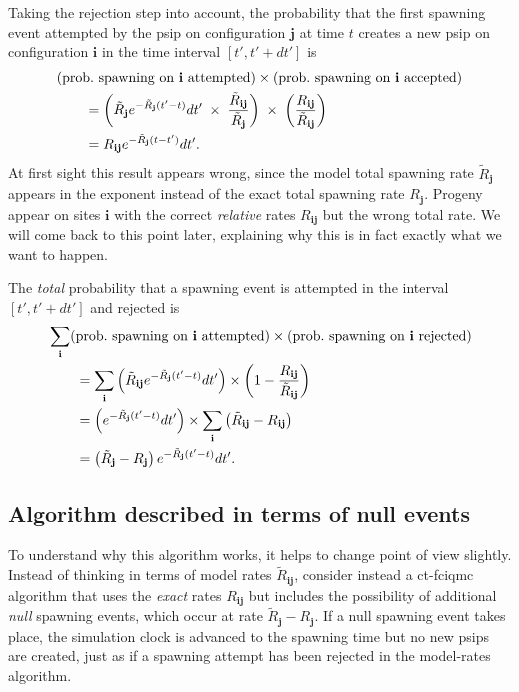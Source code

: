 \documentclass[a4paper, 11pt]{article}
\newcommand{\bi}{\mathbf{i}}
\newcommand{\bj}{\mathbf{j}}
\begin{document}
Taking the rejection step into account, the probability that the first
spawning event attempted by the psip on configuration $\bj$ at time
$t$ creates a new psip on configuration $\bi$ in the time interval
$[t',t'+dt']$ is
\begin{align*}
  \MoveEqLeft (\text{prob.\ spawning on $\bi$ attempted}) \times
  (\text{prob.\ spawning on $\bi$ accepted}) \\
  & = \left ( \tilde{R}_{\bj} e^{-\tilde{R}_{\bj}(t' - t)} dt' \; \times \;
  \frac{\tilde{R}_{\bi\bj}}{\tilde{R}_{\bj}} \right ) \; \times \; 
  \left ( \frac{R_{\bi\bj}}{\tilde{R}_{\bi\bj}} \right ) \\
  & = R_{\bi\bj} e^{-\tilde{R}_{\bj}(t-t')} dt' .
\end{align*}
At first sight this result appears wrong, since the model total spawning
rate $\tilde{R}_{\bj}$ appears in the exponent instead of the exact
total spawning rate $R_{\bj}$. Progeny appear on sites $\bi$ with the
correct \emph{relative} rates $R_{\bi\bj}$ but the wrong total rate. We
will come back to this point later, explaining why this is in fact
exactly what we want to happen.

The \emph{total} probability that a spawning event is attempted in the
interval $[t',t'+dt']$ and rejected is
\begin{align*}
  \MoveEqLeft \sum_{\bi} (\text{prob.\ spawning on $\bi$ attempted}) \times
  (\text{prob.\ spawning on $\bi$ rejected}) \\
  & = \sum_{\bi} \left (  \tilde{R}_{\bi\bj} e^{-\tilde{R}_{\bj}(t'-t)} dt' 
  \right ) \times \left ( 1 -
    \frac{R_{\bi\bj}}{\tilde{R}_{\bi\bj}} \right ) \\
  & = \left ( e^{-\tilde{R}_{\bj}(t'-t)} dt'\right ) \times
  \sum_{\bi} \left ( \tilde{R}_{\bi\bj} - R_{\bi\bj} \right ) \\
  & = \left ( \tilde{R}_{\bj} - R_{\bj} \right ) e^{-\tilde{R}_{\bj}(t'-t)}
  dt' .
\end{align*}

\subsection*{Algorithm described in terms of null events}

To understand why this algorithm works, it helps to change point of view
slightly. Instead of thinking in terms of model rates
$\tilde{R}_{\bi\bj}$, consider instead a ct-fciqmc algorithm that uses
the \emph{exact} rates $R_{\bi\bj}$ but includes the possibility of
additional \emph{null} spawning events, which occur at rate
$\tilde{R}_{\bj} - R_{\bj}$. If a null spawning event takes place, the
simulation clock is advanced to the spawning time but no new psips are
created, just as if a spawning attempt has been rejected in the
model-rates algorithm.
\end{document}
